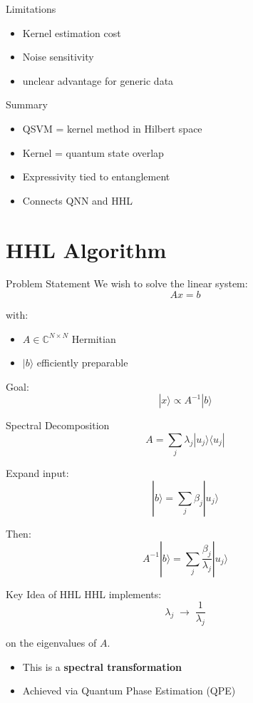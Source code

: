 \documentclass{beamer}
\begin{document}
\begin{frame}{Limitations}
\begin{itemize}
\item Kernel estimation cost
\item Noise sensitivity
\item unclear advantage for generic data
\end{itemize}
\end{frame}

\begin{frame}{Summary}
\begin{itemize}
\item QSVM = kernel method in Hilbert space
\item Kernel = quantum state overlap
\item Expressivity tied to entanglement
\item Connects QNN and HHL
\end{itemize}
\end{frame}

\section{HHL Algorithm}

\begin{frame}{Problem Statement}
We wish to solve the linear system:
\[
A x = b
\]

with:
\begin{itemize}
\item $A \in \mathbb{C}^{N \times N}$ Hermitian
\item $|b\rangle$ efficiently preparable
\end{itemize}

Goal:
\[
|x\rangle \propto A^{-1}|b\rangle
\]
\end{frame}

\begin{frame}{Spectral Decomposition}
\[
A = \sum_j \lambda_j |u_j\rangle\langle u_j|
\]

Expand input:
\[
|b\rangle = \sum_j \beta_j |u_j\rangle
\]

Then:
\[
A^{-1}|b\rangle = \sum_j \frac{\beta_j}{\lambda_j} |u_j\rangle
\]
\end{frame}

\begin{frame}{Key Idea of HHL}
HHL implements:
\[
\lambda_j \;\longrightarrow\; \frac{1}{\lambda_j}
\]

on the eigenvalues of $A$.

\begin{itemize}
\item This is a \textbf{spectral transformation}
\item Achieved via Quantum Phase Estimation (QPE)
\end{itemize}
\end{frame}
\end{document}
